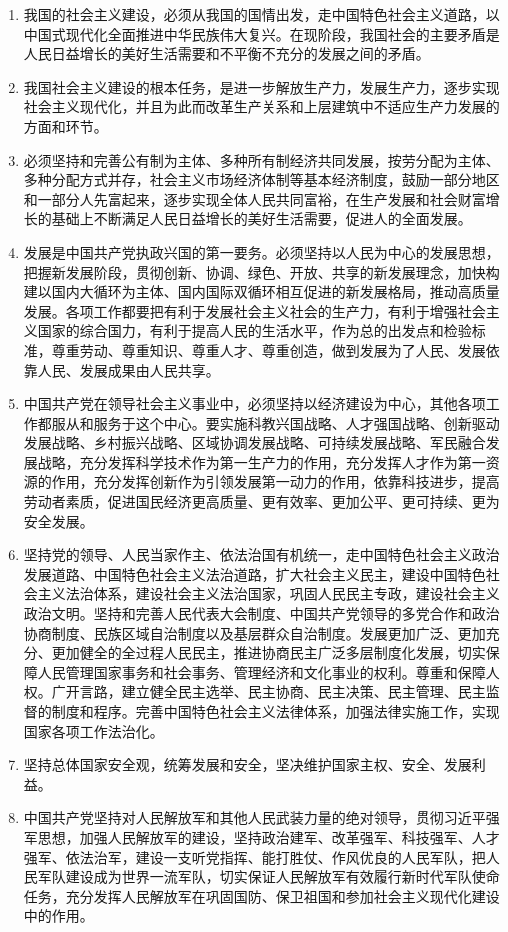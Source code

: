 \documentclass[UTF8,11pt,a4paper]{ctexart}
\begin{document}
\begin{enumerate}[label=\arabic*., leftmargin=2.3em]
\item 我国的社会主义建设，必须从我国的国情出发，走中国特色社会主义道路，以中国式现代化全面推进中华民族伟大复兴。在现阶段，我国社会的主要矛盾是人民日益增长的美好生活需要和不平衡不充分的发展之间的矛盾。
\item 我国社会主义建设的根本任务，是进一步解放生产力，发展生产力，逐步实现社会主义现代化，并且为此而改革生产关系和上层建筑中不适应生产力发展的方面和环节。
\item 必须坚持和完善公有制为主体、多种所有制经济共同发展，按劳分配为主体、多种分配方式并存，社会主义市场经济体制等基本经济制度，鼓励一部分地区和一部分人先富起来，逐步实现全体人民共同富裕，在生产发展和社会财富增长的基础上不断满足人民日益增长的美好生活需要，促进人的全面发展。
\item 发展是中国共产党执政兴国的第一要务。必须坚持以人民为中心的发展思想，把握新发展阶段，贯彻创新、协调、绿色、开放、共享的新发展理念，加快构建以国内大循环为主体、国内国际双循环相互促进的新发展格局，推动高质量发展。各项工作都要把有利于发展社会主义社会的生产力，有利于增强社会主义国家的综合国力，有利于提高人民的生活水平，作为总的出发点和检验标准，尊重劳动、尊重知识、尊重人才、尊重创造，做到发展为了人民、发展依靠人民、发展成果由人民共享。
\item 中国共产党在领导社会主义事业中，必须坚持以经济建设为中心，其他各项工作都服从和服务于这个中心。要实施科教兴国战略、人才强国战略、创新驱动发展战略、乡村振兴战略、区域协调发展战略、可持续发展战略、军民融合发展战略，充分发挥科学技术作为第一生产力的作用，充分发挥人才作为第一资源的作用，充分发挥创新作为引领发展第一动力的作用，依靠科技进步，提高劳动者素质，促进国民经济更高质量、更有效率、更加公平、更可持续、更为安全发展。
\item 坚持党的领导、人民当家作主、依法治国有机统一，走中国特色社会主义政治发展道路、中国特色社会主义法治道路，扩大社会主义民主，建设中国特色社会主义法治体系，建设社会主义法治国家，巩固人民民主专政，建设社会主义政治文明。坚持和完善人民代表大会制度、中国共产党领导的多党合作和政治协商制度、民族区域自治制度以及基层群众自治制度。发展更加广泛、更加充分、更加健全的全过程人民民主，推进协商民主广泛多层制度化发展，切实保障人民管理国家事务和社会事务、管理经济和文化事业的权利。尊重和保障人权。广开言路，建立健全民主选举、民主协商、民主决策、民主管理、民主监督的制度和程序。完善中国特色社会主义法律体系，加强法律实施工作，实现国家各项工作法治化。
\item 坚持总体国家安全观，统筹发展和安全，坚决维护国家主权、安全、发展利益。
\item 中国共产党坚持对人民解放军和其他人民武装力量的绝对领导，贯彻习近平强军思想，加强人民解放军的建设，坚持政治建军、改革强军、科技强军、人才强军、依法治军，建设一支听党指挥、能打胜仗、作风优良的人民军队，把人民军队建设成为世界一流军队，切实保证人民解放军有效履行新时代军队使命任务，充分发挥人民解放军在巩固国防、保卫祖国和参加社会主义现代化建设中的作用。

\end{enumerate}
\end{document}
